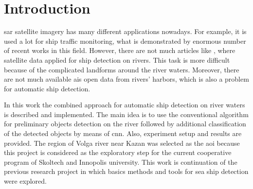\section{Introduction}

\gls{sar} satellite imagery has many different applications nowadays. For example, it is used a lot for ship traffic monitoring, what is demonstrated by enormous number of recent works in this field. However, there are not much articles like \cite{danube}, where satellite data applied for ship detection on rivers. This task is more difficult because of the complicated landforms around the river waters. Moreover, there are not much available \gls{ais} open data from rivers' harbors, which is also a problem for automatic ship detection. 

In this work the combined approach for automatic ship detection on river waters is described and implemented. The main idea is to use the conventional algorithm for preliminary objects detection on the river followed by additional classification of the detected objects by means of \gls{cnn}. Also, experiment setup and results are provided. The region of Volga river near Kazan was selected as the \gls{aoi} because this project is considered as the exploratory step for the current cooperative program of Skoltech and Innopolis university. This work is continuation of the previous research project in which basics methods and tools for sea ship detection were explored.
